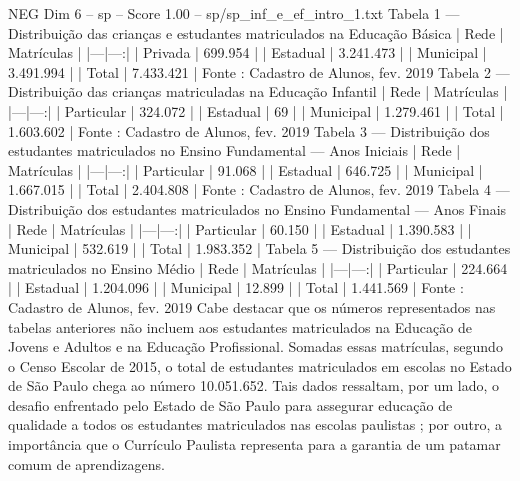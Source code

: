 \begin{textsample}{NEG Dim 6 – sp – Score 1.00 – sp/sp\_inf\_e\_ef\_intro\_1.txt}
Tabela 1 — Distribuição das crianças e estudantes matriculados na Educação Básica | Rede | Matrículas | |---|---:| | Privada | 699.954 | | Estadual | 3.241.473 | | Municipal | 3.491.994 | | Total | 7.433.421 | Fonte : Cadastro de Alunos, fev. 2019 Tabela 2 — Distribuição das crianças matriculadas na Educação Infantil | Rede | Matrículas | |---|---:| | Particular | 324.072 | | Estadual | 69 | | Municipal | 1.279.461 | | Total | 1.603.602 | Fonte : Cadastro de Alunos, fev. 2019 Tabela 3 — Distribuição dos estudantes matriculados no Ensino Fundamental — Anos Iniciais | Rede | Matrículas | |---|---:| | Particular | 91.068 | | Estadual | 646.725 | | Municipal | 1.667.015 | | Total | 2.404.808 | Fonte : Cadastro de Alunos, fev. 2019 Tabela 4 — Distribuição dos estudantes matriculados no Ensino Fundamental — Anos Finais | Rede | Matrículas | |---|---:| | Particular | 60.150 | | Estadual | 1.390.583 | | Municipal | 532.619 | | Total | 1.983.352 | Tabela 5 — Distribuição dos estudantes matriculados no Ensino Médio | Rede | Matrículas | |---|---:| | Particular | 224.664 | | Estadual | 1.204.096 | | Municipal | 12.899 | | Total | 1.441.569 | Fonte : Cadastro de Alunos, fev. 2019 Cabe destacar que os números representados nas tabelas anteriores não incluem aos estudantes matriculados na Educação de Jovens e Adultos e na Educação Profissional.
Somadas essas matrículas, segundo o Censo Escolar de 2015, o total de estudantes matriculados em escolas no Estado de São Paulo chega ao número 10.051.652.
Tais dados ressaltam, por um lado, o desafio enfrentado pelo Estado de São Paulo para assegurar educação de qualidade a todos os estudantes matriculados nas escolas paulistas ; por outro, a importância que o Currículo Paulista representa para a garantia de um patamar comum de aprendizagens.

\end{textsample}
